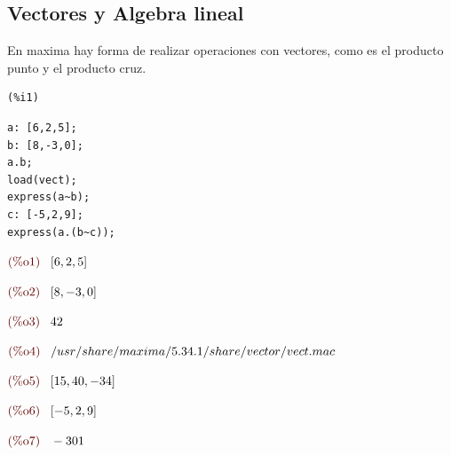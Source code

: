 \documentclass[12pt]{article}
\begin{document}
\subsection{Vectores y Algebra lineal}
En maxima hay forma de realizar operaciones con vectores, como es el producto punto y el producto cruz.

\noindent

\begin{minipage}[t]{8ex}{\color{red}\bf
\begin{verbatim}
(%i1) 
\end{verbatim}}
\end{minipage}
\begin{minipage}[t]{\textwidth}{\color{blue}
\begin{verbatim}
a: [6,2,5];
b: [8,-3,0];
a.b;
load(vect);
express(a~b);
c: [-5,2,9];
express(a.(b~c));
\end{verbatim}}
\end{minipage}

\begin{math}\displaystyle
\parbox{8ex}{\color{labelcolor}(\%o1) }
[6,2,5]
\end{math}

\begin{math}\displaystyle
\parbox{8ex}{\color{labelcolor}(\%o2) }
[8,-3,0]
\end{math}

\begin{math}\displaystyle
\parbox{8ex}{\color{labelcolor}(\%o3) }
42
\end{math}

\begin{math}\displaystyle
\parbox{8ex}{\color{labelcolor}(\%o4) }
/usr/share/maxima/5.34.1/share/vector/vect.mac
\end{math}

\begin{math}\displaystyle
\parbox{8ex}{\color{labelcolor}(\%o5) }
[15,40,-34]
\end{math}

\begin{math}\displaystyle
\parbox{8ex}{\color{labelcolor}(\%o6) }
[-5,2,9]
\end{math}

\begin{math}\displaystyle
\parbox{8ex}{\color{labelcolor}(\%o7) }
-301
\end{math}

\end{document}
